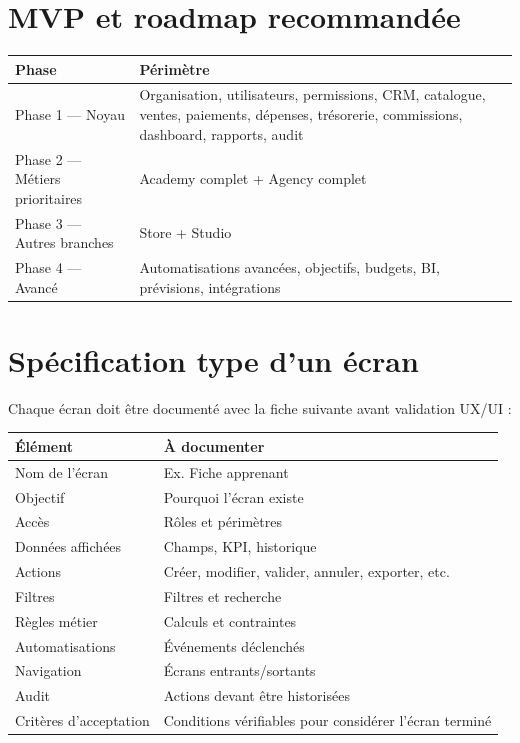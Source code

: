 \documentclass[11pt,a4paper]{article}
\newcommand{\tableheader}[2]{\textbf{#1} & \textbf{#2} \\ \hline}
\begin{document}
\section{MVP et roadmap recommandée}

\begin{tabularx}{\textwidth}{|l|X|}
\hline
\tableheader{Phase}{Périmètre}
Phase 1 --- Noyau & Organisation, utilisateurs, permissions, CRM, catalogue, ventes, paiements, dépenses, trésorerie, commissions, dashboard, rapports, audit \\ \hline
Phase 2 --- Métiers prioritaires & Academy complet + Agency complet \\ \hline
Phase 3 --- Autres branches & Store + Studio \\ \hline
Phase 4 --- Avancé & Automatisations avancées, objectifs, budgets, BI, prévisions, intégrations \\ \hline
\end{tabularx}

\section{Spécification type d'un écran}

Chaque écran doit être documenté avec la fiche suivante avant validation UX/UI :

\begin{tabularx}{\textwidth}{|l|X|}
\hline
\tableheader{Élément}{À documenter}
Nom de l'écran & Ex. Fiche apprenant \\ \hline
Objectif & Pourquoi l'écran existe \\ \hline
Accès & Rôles et périmètres \\ \hline
Données affichées & Champs, KPI, historique \\ \hline
Actions & Créer, modifier, valider, annuler, exporter, etc. \\ \hline
Filtres & Filtres et recherche \\ \hline
Règles métier & Calculs et contraintes \\ \hline
Automatisations & Événements déclenchés \\ \hline
Navigation & Écrans entrants/sortants \\ \hline
Audit & Actions devant être historisées \\ \hline
Critères d'acceptation & Conditions vérifiables pour considérer l'écran terminé \\ \hline
\end{tabularx}
\end{document}
